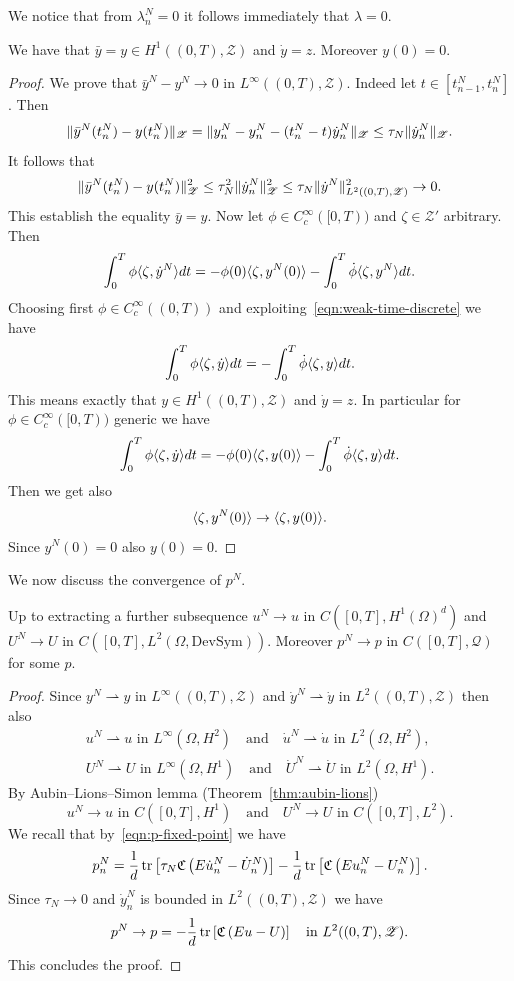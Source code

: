 We notice that from $\lambda_n^N=0$ it follows immediately that $\lambda=0$.
\begin{lemma}
We have that $\bar{y}=y\in H^1((0,T),\mathscr{Z})$ and $\dot y=z$. Moreover $y(0)=0$.
\end{lemma}
\begin{proof}
We prove that $\bar{y}^N-y^N\to0$ in $L^\infty((0,T),\mathscr{Z})$. Indeed let $t\in[t_{n-1}^N,t_n^N]$. Then
\[
\lVert\bar{y}^N(t_n^N)-y(t_n^N)\rVert_\mathscr{Z}=\lVert y_n^N-y_n^N-(t_n^N-t)\dot y_n^N\rVert_\mathscr{Z}\le\tau_N\lVert\dot y_n^N\rVert_\mathscr{Z}.
\]
It follows that
\[
\lVert\bar{y}^N(t_n^N)-y(t_n^N)\rVert_\mathscr{Z}^2\le\tau_N^2\lVert\dot y_n^N\rVert_\mathscr{Z}^2\le\tau_N\lVert\dot y^N\rVert_{L^2((0,T),\mathscr{Z})}^2\to0.
\]
This establish the equality $\bar{y}=y$. Now let $\phi\in C^\infty_c([0,T))$ and $\zeta\in\mathscr{Z}'$ arbitrary. Then
\[
\int_0^T\phi\langle\zeta,\dot y^N\rangle dt=-\phi(0)\langle\zeta,y^N(0)\rangle-\int_0^T\dot\phi\langle\zeta,y^N\rangle dt.
\]
Choosing first $\phi\in C^\infty_c((0,T))$ and exploiting~\eqref{eqn:weak-time-discrete} we have
\[
\int_0^T\phi\langle\zeta,\dot y\rangle dt=-\int_0^T\dot\phi\langle\zeta,y\rangle dt.
\]
This means exactly that $y\in H^1((0,T),\mathscr{Z})$ and $\dot y=z$. In particular for $\phi\in C^\infty_c([0,T))$ generic we have
\[
\int_0^T\phi\langle\zeta,\dot y\rangle dt=-\phi(0)\langle\zeta,y(0)\rangle-\int_0^T\dot\phi\langle\zeta,y\rangle dt.
\]
Then we get also
\[
\langle\zeta,y^N(0)\rangle\to\langle\zeta,y(0)\rangle.
\]
Since $y^N(0)=0$ also $y(0)=0$.
\end{proof}
We now discuss the convergence of $p^N$.
\begin{lemma}
\label{lemma:convergence-p}
Up to extracting a further subsequence $u^N\to u$ in $C([0,T],H^1(\Omega)^d)$ and $U^N\to U$ in $C([0,T],L^2(\Omega,\text{DevSym}))$. Moreover $p^N\to p$ in $C([0,T],\mathscr{Q})$ for some $p$.
\end{lemma}
\begin{proof}
Since $y^N\rightharpoonup y$ in $L^\infty((0,T),\mathscr{Z})$ and $\dot y^N\rightharpoonup\dot y$ in $L^2((0,T),\mathscr{Z})$ then also
\begin{gather*}
u^N\rightharpoonup u\text{ in $L^\infty(\Omega,H^2)$}\quad\text{and}\quad\dot u^N\rightharpoonup\dot u\text{ in $L^2(\Omega,H^2)$}, \\
U^N\rightharpoonup U\text{ in $L^\infty(\Omega,H^1)$}\quad\text{and}\quad\dot U^N\rightharpoonup\dot U\text{ in $L^2(\Omega,H^1)$}.
\end{gather*}
By Aubin--Lions--Simon lemma (Theorem~\ref{thm:aubin-lions})
\[
u^N\to u\text{ in $C([0,T],H^1)$}\quad\text{and}\quad U^N\to U\text{ in $C([0,T],L^2)$}.
\]
We recall that by~\eqref{eqn:p-fixed-point} we have
\begin{equation}
\label{eqn:pn}
p_n^N=\frac{1}{d}\operatorname{tr}\left[\tau_N\mathfrak{C}\left(E\dot u_n^N-\dot U_n^N\right)\right]-\frac{1}{d}\operatorname{tr}\left[\mathfrak{C}\left(Eu_n^N-U_n^N\right)\right].
\end{equation}
Since $\tau_N\to0$ and $\dot y_n^N$ is bounded in $L^2((0,T),\mathscr{Z})$ we have
\[
p^N\to p=-\frac{1}{d}\operatorname{tr}\left[\mathfrak{C}\left(Eu-U\right)\right]\quad\text{in $L^2((0,T),\mathscr{Z})$}.
\]
This concludes the proof.
\end{proof}
